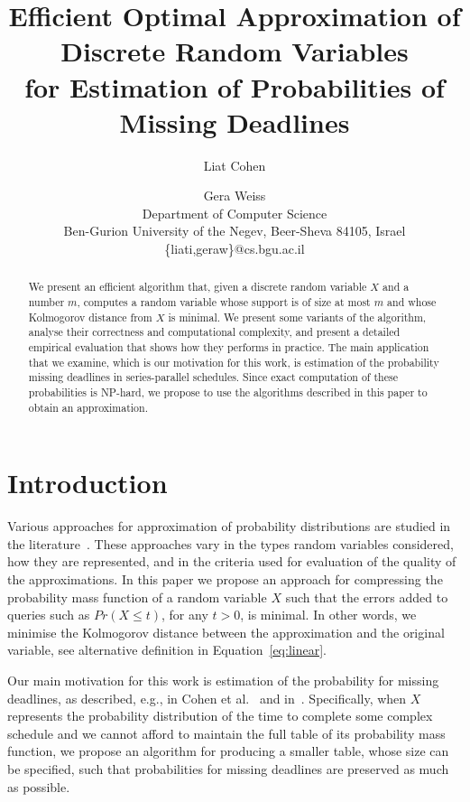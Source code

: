 \documentclass[letterpaper]{article} %
\begin{document}
\title{Efficient Optimal Approximation of Discrete Random Variables \\ for Estimation of Probabilities of Missing Deadlines}
\author{Liat Cohen \and Gera Weiss\\
    Department of Computer Science\\
		Ben-Gurion University of the Negev, Beer-Sheva 84105, Israel\\
		\{liati,geraw\}@cs.bgu.ac.il\\}
\maketitle
\begin{abstract}
We present an efficient algorithm that, given a discrete random variable $X$ and a number $m$, computes a random variable whose support is of size at most $m$ and whose Kolmogorov distance from $X$ is minimal. We present some variants of the algorithm, analyse their correctness and computational complexity, and present a detailed empirical evaluation that shows how they performs in practice. The main application that we examine, which is our motivation for this work, is estimation of the probability missing deadlines in series-parallel schedules. Since exact computation of these probabilities is NP-hard, we propose to use the algorithms described in this paper to obtain an approximation.   
\end{abstract}


\section{Introduction}


Various approaches for approximation of probability distributions are studied in the literature~\cite{PS77,AMCR83,vidyasagar2012metric,cohen2015estimating,pavlikov2016cvar,CohenGW18}. 
These approaches vary in the types random variables considered, how they are represented, and in the criteria used for evaluation of the quality of the approximations. In this paper we propose an approach for compressing the probability mass function of a random variable $X$ such that the errors added to queries such as $Pr(X\leq t)$, for  any $t>0$, is minimal. In other words, we minimise the Kolmogorov distance between the approximation and the original variable, see alternative definition in Equation~\eqref{eq:linear}. 

Our main motivation for this work is estimation of the probability for missing deadlines, as described, e.g., in Cohen et al.~\cite{cohen2015estimating,CohenGW18} and in~\cite{Kashef18}. Specifically, when $X$ represents the probability distribution of the time to complete some complex schedule and we cannot afford to maintain the full table of its probability mass function, we propose an algorithm for producing a smaller table, whose size can be specified, such that probabilities for missing deadlines are preserved as much as possible. 
\end{document}

